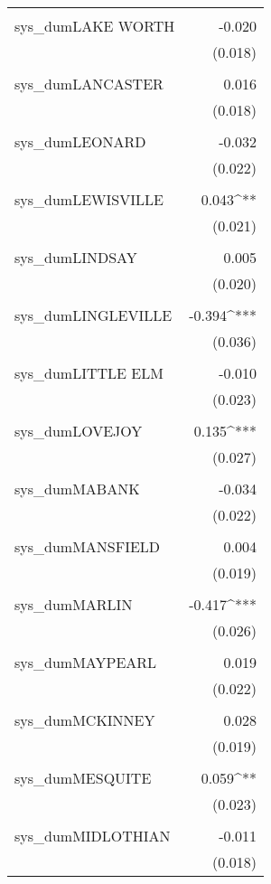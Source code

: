 \begin{table}[!htbp]
\begin{tabular}{@{\extracolsep{5pt}}lD{.}{.}{-3} }
  & \\ 
 sys\_dumLAKE WORTH & -0.020 \\ 
  & (0.018) \\ 
  & \\ 
 sys\_dumLANCASTER & 0.016 \\ 
  & (0.018) \\ 
  & \\ 
 sys\_dumLEONARD & -0.032 \\ 
  & (0.022) \\ 
  & \\ 
 sys\_dumLEWISVILLE & 0.043^{**} \\ 
  & (0.021) \\ 
  & \\ 
 sys\_dumLINDSAY & 0.005 \\ 
  & (0.020) \\ 
  & \\ 
 sys\_dumLINGLEVILLE & -0.394^{***} \\ 
  & (0.036) \\ 
  & \\ 
 sys\_dumLITTLE ELM & -0.010 \\ 
  & (0.023) \\ 
  & \\ 
 sys\_dumLOVEJOY & 0.135^{***} \\ 
  & (0.027) \\ 
  & \\ 
 sys\_dumMABANK & -0.034 \\ 
  & (0.022) \\ 
  & \\ 
 sys\_dumMANSFIELD & 0.004 \\ 
  & (0.019) \\ 
  & \\ 
 sys\_dumMARLIN & -0.417^{***} \\ 
  & (0.026) \\ 
  & \\ 
 sys\_dumMAYPEARL & 0.019 \\ 
  & (0.022) \\ 
  & \\ 
 sys\_dumMCKINNEY & 0.028 \\ 
  & (0.019) \\ 
  & \\ 
 sys\_dumMESQUITE & 0.059^{**} \\ 
  & (0.023) \\ 
  & \\ 
 sys\_dumMIDLOTHIAN & -0.011 \\ 
  & (0.018) \\ 

\end{tabular}
\end{table}
